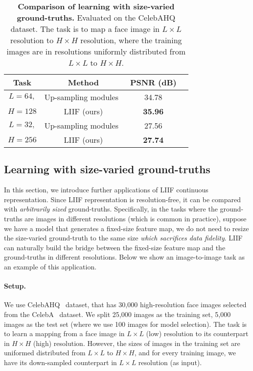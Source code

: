 \documentclass[final]{cvpr}
\begin{document}
\begin{table}[]
    \centering
    \begin{tabular}{c|c|cc}
        Task & Method & PSNR (dB) \\
        \hline
        $L=64,$ & Up-sampling modules~\cite{lim2017enhanced} & 34.78 \\
        $H=128$ & LIIF (ours) & \textbf{35.96} \\
        \hline
        $L=32,$ & Up-sampling modules~\cite{lim2017enhanced} & 27.56 \\
        $H=256$ & LIIF (ours) & \textbf{27.74} \\
    \end{tabular}
    \caption{\textbf{Comparison of learning with size-varied ground-truths.} Evaluated on the CelebAHQ dataset. The task is to map a face image in $L\times L$ resolution to $H\times H$ resolution, where the training images are in resolutions uniformly distributed from $L\times L$ to $H\times H$.}
    \label{tab:facesr}
\end{table}

\subsection{Learning with size-varied ground-truths}

In this section, we introduce further applications of LIIF continuous representation. Since LIIF representation is resolution-free, it can be compared with \emph{arbitrarily sized} ground-truths. Specifically, in the tasks where the ground-truths are images in different resolutions (which is common in practice), suppose we have a model that generates a fixed-size feature map, we do not need to resize the size-varied ground-truth to the same size \emph{which sacrifices data fidelity}. LIIF can naturally build the bridge between the fixed-size feature map and the ground-truths in different resolutions. Below we show an image-to-image task as an example of this application.

\vspace{-1em}
\paragraph{Setup.} We use CelebAHQ~\cite{karras2017progressive} dataset, that has 30,000 high-resolution face images selected from the CelebA~\cite{liu2015deep} dataset. We split 25,000 images as the training set, 5,000 images as the test set (where we use 100 images for model selection). The task is to learn a mapping from a face image in $L\times L$ (low) resolution to its counterpart in $H\times H$ (high) resolution. However, the sizes of images in the training set are uniformed distributed from $L\times L$ to $H\times H$, and for every training image, we have its down-sampled counterpart in $L\times L$ resolution (as input).
\end{document}
